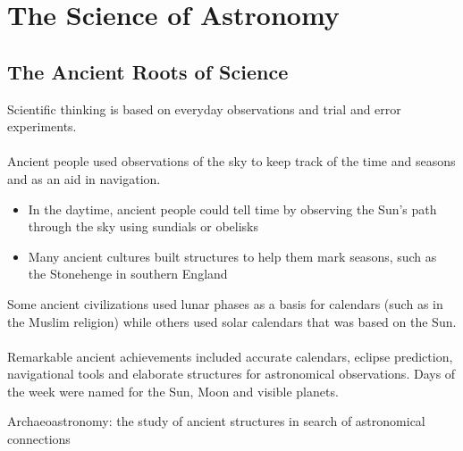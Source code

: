 \documentclass[12pt]{article}
\begin{document}
\section{The Science of Astronomy} 
\subsection{The Ancient Roots of Science} 
Scientific thinking is based on everyday observations and trial and error experiments. \\~\\
Ancient people used observations of the sky to keep track of the time and seasons and as an aid in navigation. \begin{itemize} 
\item In the daytime, ancient people could tell time by observing the Sun's path through the sky using sundials or obelisks 
\item Many ancient cultures built structures to help them mark seasons, such as the Stonehenge in southern England \end{itemize} 
Some ancient civilizations used lunar phases as a basis for calendars (such as in the Muslim religion) while others used solar calendars that was based on the Sun. \\~\\
Remarkable ancient achievements included accurate calendars, eclipse prediction, navigational tools and elaborate structures for astronomical observations. Days of the week were named for the Sun, Moon and visible planets. 
\begin{definition} Archaeoastronomy: the study of ancient structures in search of astronomical connections \end{definition} 
\end{document}
